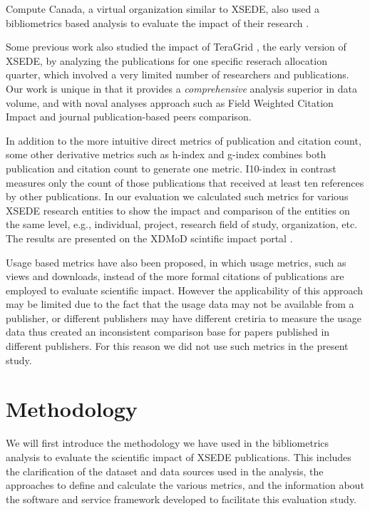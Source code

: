 \documentclass{sig-alternate}
\begin{document}
Compute Canada, a virtual organization similar to XSEDE, also used a bibliometrics based analysis
to evaluate the impact of their research \cite{www-computecanada}.

Some previous work also studied the impact of TeraGrid \cite {bollen2011and}, the early version
of XSEDE, by analyzing the publications for one specific reserach allocation quarter, which involved
a very limited number of researchers and publications. Our work is unique in that it provides
a {\em comprehensive} analysis superior in data volume, and with noval analyses approach such as Field Weighted
Citation Impact and journal publication-based peers comparison.

In addition to the more intuitive direct metrics of publication and citation count, some other
derivative metrics such as h-index \cite{hirsch2005index} and g-index \cite{egghe2006theory} combines
both publication and citation count to generate one metric. I10-index \cite {www-i10index} in contrast measures only the count of those publications that received at least ten references by other publications.
In our evaluation we calculated such metrics for various XSEDE research entities to show the impact and comparison of the entities
on the same level, e.g., individual, project, research field of study, organization, etc. The results
are presented on the XDMoD scintific impact portal \cite{www-xdmod-sciimp}.


Usage based metrics\cite {Bollen:2007:MUM:1255175.1255273,Bollen:2008:TUI:1378889.1378928} have also been proposed,
in which usage metrics, such as views and downloads, instead of the more formal citations of publications are employed
to evaluate scientific impact. However the applicability of this approach may be limited due to the fact that the usage
data may not be available from a publisher, or different publishers may have different cretiria to measure
the usage data thus created an inconsistent comparison base for papers published in different publishers.
For this reason we did not use such metrics in the present study.

\section{Methodology} \label{S:methodology}

We will first introduce the methodology we have used in the bibliometrics analysis to evaluate the
scientific impact of XSEDE publications. This includes the clarification of the dataset and data sources
used in the analysis, the approaches to define and calculate the various metrics, and the information
about the software and service framework developed to facilitate this evaluation study.
\end{document}

